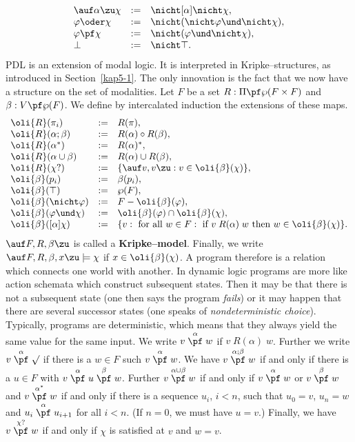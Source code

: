 $$\begin{array}{l@{\quad := \quad}l}
\auf \alpha\zu \chi & \nicht [\alpha] \nicht \chi, \\
\varphi \oder \chi & \nicht (\nicht \varphi \und \nicht \chi), \\
\varphi \pf \chi & \nicht (\varphi \und \nicht \chi), \\
\bot & \nicht \top.
\end{array}$$
{\sf PDL} is an extension of modal logic. It is interpreted in
Kripke--structures, as introduced in Section~\ref{kap5-1}.
The only innovation is the fact that we now have a structure
on the set of modalities. Let $F$ be a set $R :
\Pi \pf \wp(F \times F)$ and $\beta : V \pf \wp(F)$.
We define by intercalated induction the extensions of these
maps.
$$\begin{array}{l@{\quad := \quad}l}
\oli{R}(\pi_i) & R(\pi), \\
\oli{R}(\alpha;\beta) & R(\alpha) \circ R(\beta), \\
\oli{R}(\alpha^{\ast}) & R(\alpha)^{\ast}, \\
\oli{R}(\alpha \cup \beta) & R(\alpha) \cup R(\beta), \\
\oli{R}(\chi?) & \{\auf v,v\zu : v \in \oli{\beta}(\chi)\}, \\
\oli{\beta}(p_i) & \beta(p_i), \\
\oli{\beta}(\top) & \wp(F), \\
\oli{\beta}(\nicht \varphi) & F - \oli{\beta}(\varphi), \\
\oli{\beta}(\varphi \und \chi) & \oli{\beta}(\varphi) \cap
    \oli{\beta}(\chi), \\
\oli{\beta}([\alpha]\chi) & \{v :
    \mbox{ for all }w \in F: \mbox{ if }v\; R(\alpha)\; w
    \mbox{ then }w \in \oli{\beta}(\chi)\}.
\end{array}$$
$\auf F, R, \beta\zu$ is called a {\bf Kripke--model}. Finally,
we write $\auf F, R, \beta, x\zu \models \chi$ if
$x \in \oli{\beta}(\chi)$. A program therefore is a
relation which connects one world with another.
In dynamic logic programs are more like action schemata
which construct subsequent states. Then it may be that there
is not a subsequent state (one then says the program
{\it fails\/}) or it may happen that there are several
successor states (one speaks of {\it nondeterministic choice\/}).
Typically, programs are deterministic, which means that
they always yield the same value for the same input.
We write $v \stackrel{\alpha}{\pf} w$ if $v\; R(\alpha)\; w$.
Further we write $v \stackrel{\alpha}{\pf} \surd$ if there is a
$w \in F$ such $v \stackrel{\alpha}{\pf} w$. We have
$v \stackrel{\alpha; \beta}{\pf} w$ if and only if there is a
$u \in F$ with $v \stackrel{\alpha}{\pf} u \stackrel{\beta}{\pf} w$.
Further $v \stackrel{\alpha \cup \beta}{\pf} w$ if and only if
$v \stackrel{\alpha}{\pf} w$ or $v \stackrel{\beta}{\pf} w$ and
$v \stackrel{\alpha^{\ast}}{\pf} w$ if and only if there is a
sequence $u_i$, $i < n$, such that $u_0 = v$, $u_n = w$ and
$u_i \stackrel{\alpha}{\pf} u_{i+1}$ for all $i < n$. (If
$n = 0$, we must have $u = v$.) Finally, we have
$v \stackrel{\chi?}{\pf} w$ if and only if $\chi$ is satisfied
at $v$ and $w = v$.

